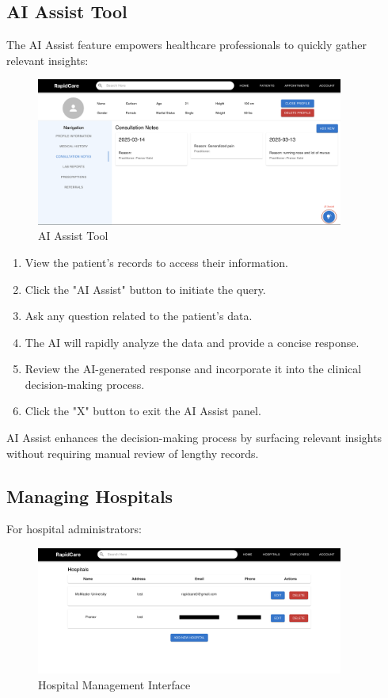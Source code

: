 \documentclass[12pt, titlepage]{article}
\begin{document}
\subsection{AI Assist Tool}

The AI Assist feature empowers healthcare professionals to quickly gather relevant insights:

\begin{figure}[H]
\centering
\includegraphics[width=0.9\textwidth]{AI.png}
\caption{AI Assist Tool}
\label{fig:AI Assist tool}
\end{figure}

\begin{enumerate} 
\item View the patient's records to access their information. 
\item Click the "AI Assist" button to initiate the query. 
\item Ask any question related to the patient's data.
\item The AI will rapidly analyze the data and provide a concise response. 
\item Review the AI-generated response and incorporate it into the clinical decision-making process. 
\item Click the "X" button to exit the AI Assist panel.
\end{enumerate}

AI Assist enhances the decision-making process by surfacing relevant insights without requiring manual review of lengthy records.

\subsection{Managing Hospitals}
For hospital administrators:

\begin{figure}[H]
\centering
\includegraphics[width=0.9\textwidth]{hospital.png}
\caption{Hospital Management Interface}
\label{fig:Hospital Management Interface}
\end{figure}
\end{document}
